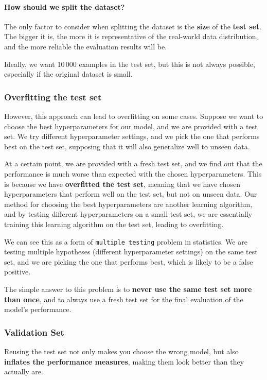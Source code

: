 \paragraph{How should we split the dataset?}
The only factor to consider when splitting the dataset is the \textbf{size} of the \textbf{test set}. The bigger
it is, the more it is representative of the real-world data distribution, and the more reliable the evaluation results will be.

Ideally, we want 10\,000 examples in the test set, but this is not always possible, especially if the original dataset is small.

\subsubsection*{Overfitting the test set}
However, this approach can lead to overfitting on some cases.
Suppose we want to choose the best hyperparameters for our model, and we are provided with a test set.
We try different hyperparameter settings, and we pick the one that performs best on the test set, supposing that it will also generalize well to unseen data.

At a certain point, we are provided with a fresh test set, and we find out that the performance is much worse than expected with the chosen hyperparameters.
This is because we have \textbf{overfitted the test set}, meaning that we have chosen hyperparameters that perform well on the test set, but not on unseen data.
Our method for choosing the best hyperparameters are another learning algorithm, and by testing different hyperparameters on a small test set,
we are essentially training this learning algorithm on the test set, leading to overfitting.

We can see this as a form of \texttt{multiple testing} problem in statistics. 
We are testing multiple hypotheses (different hyperparameter settings) on the same test set, 
and we are picking the one that performs best, which is likely to be a false positive.

The simple answer to this problem is to \textbf{never use the same test set more than once}, and to always use a fresh test set for the final evaluation of the model's performance.

\subsubsection*{Validation Set}
Reusing the test set not only makes you choose the wrong model, but also \textbf{inflates the performance measures}, 
making them look better than they actually are.

